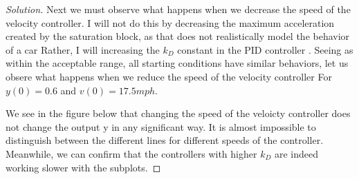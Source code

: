 \documentclass{article}
\begin{document}
\begin{proof}[Solution]
  Next we must observe what happens when we decrease the speed of the velocity controller. I will not do this by decreasing the  
  maximum acceleration created by the saturation block, as that does not realistically model the behavior of a car
  Rather, I will increasing the $k_D$ constant in the PID controller .
  Seeing as within the acceptable range, all starting conditions have similar behaviors, let us obsere what happens when we reduce the speed of the velocity controller For
  $y(0)=0.6$ and $v(0)=17.5mph$. \newline

  We see in the figure below that changing the speed of the veloicty controller does not change the output y in any significant way.
  It is almost impossible to distinguish between the different lines for different speeds of the controller. Meanwhile, we can confirm that the controllers with higher $k_D$
  are indeed working slower with the subplots. 


\end{proof}
\end{document}
